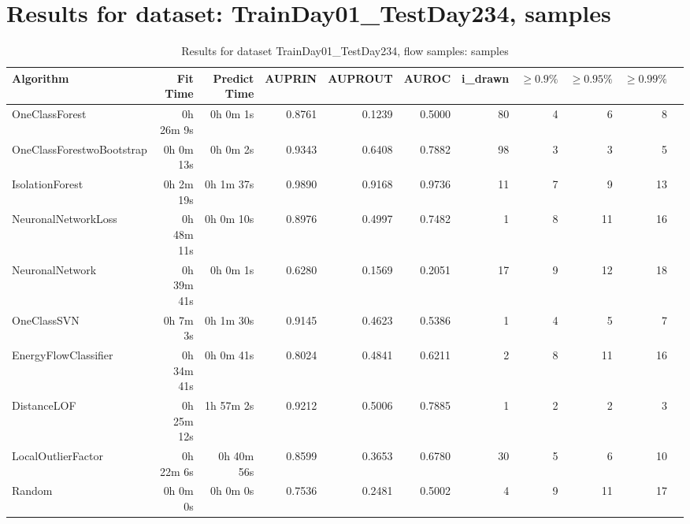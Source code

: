 \documentclass{article}
\begin{document}
\section*{Results for dataset: TrainDay01_TestDay234, samples}
\begin{table}[h!]
\centering
\caption{Results for dataset TrainDay01_TestDay234, flow samples: samples}
\begin{tabular}{lrrrrrrrrrr}
\toprule
Algorithm & Fit Time & Predict Time & AUPRIN & AUPROUT & AUROC & i\_drawn & $\geq 0.9\%$ & $\geq 0.95\%$ & $\geq 0.99\%$ \\
\midrule
OneClassForest & 0h 26m 9s & 0h 0m 1s & 0.8761 & 0.1239 & 0.5000 & 80 & 4 & 6 & 8 \\
OneClassForestwoBootstrap & 0h 0m 13s & 0h 0m 2s & 0.9343 & 0.6408 & 0.7882 & 98 & 3 & 3 & 5 \\
IsolationForest & 0h 2m 19s & 0h 1m 37s & 0.9890 & 0.9168 & 0.9736 & 11 & 7 & 9 & 13 \\
NeuronalNetworkLoss & 0h 48m 11s & 0h 0m 10s & 0.8976 & 0.4997 & 0.7482 & 1 & 8 & 11 & 16 \\
NeuronalNetwork & 0h 39m 41s & 0h 0m 1s & 0.6280 & 0.1569 & 0.2051 & 17 & 9 & 12 & 18 \\
OneClassSVN & 0h 7m 3s & 0h 1m 30s & 0.9145 & 0.4623 & 0.5386 & 1 & 4 & 5 & 7 \\
EnergyFlowClassifier & 0h 34m 41s & 0h 0m 41s & 0.8024 & 0.4841 & 0.6211 & 2 & 8 & 11 & 16 \\
DistanceLOF & 0h 25m 12s & 1h 57m 2s & 0.9212 & 0.5006 & 0.7885 & 1 & 2 & 2 & 3 \\
LocalOutlierFactor & 0h 22m 6s & 0h 40m 56s & 0.8599 & 0.3653 & 0.6780 & 30 & 5 & 6 & 10 \\
Random & 0h 0m 0s & 0h 0m 0s & 0.7536 & 0.2481 & 0.5002 & 4 & 9 & 11 & 17 \\
\bottomrule
\end{tabular}
\end{table}
\end{document}

